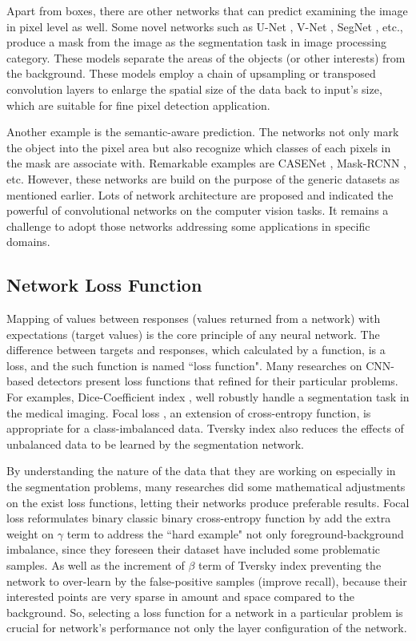 \documentclass[default,pdflatex,iicol]{sn-jnl}%
\begin{document}
Apart from boxes, there are other networks that can predict examining the image in pixel level as well. Some novel networks such as U-Net \cite{unet}, V-Net \cite{vnet}, SegNet \cite{segnet}, etc., produce a mask from the image as the segmentation task in image processing category. These models separate the areas of the objects (or other interests) from the background. These models employ a chain of upsampling or transposed convolution layers to enlarge the spatial size of the data back to input's size, which are suitable for fine pixel detection application.

Another example is the semantic-aware prediction. The networks not only mark the object into the pixel area but also recognize which classes of each pixels in the mask are associate with. Remarkable examples are CASENet \cite{casenet}, Mask-RCNN \cite{maskrcnn}, etc. However, these networks are build on the purpose of the generic datasets as mentioned earlier. Lots of network architecture are proposed and indicated the powerful of convolutional networks on the computer vision tasks. It remains a challenge to adopt those networks addressing some applications in specific domains.

\subsection{Network Loss Function}\label{review_loss}
Mapping of values between responses (values returned from a network) with expectations (target values) is the core principle of any neural network. The difference  between targets and responses, which calculated by a function, is a loss, and the such function is named ``loss function". Many researches on CNN-based detectors present loss functions that refined for their particular problems. For examples, Dice-Coefficient index \cite{vnet, gendice}, well robustly handle a segmentation task in the medical imaging. Focal loss \cite{focalloss1}, an extension of cross-entropy function, is appropriate for a class-imbalanced data. Tversky index \cite{tverskyloss} also reduces the effects of unbalanced data to be learned by the segmentation network.

By understanding the nature of the data that they are working on especially in the segmentation problems, many researches did some mathematical adjustments on the exist loss functions, letting their networks produce preferable results. Focal loss \cite{focalloss1} reformulates binary classic binary cross-entropy function by add the extra weight on $\gamma$ term to address the ``hard example" not only foreground-background imbalance, since they foreseen their dataset have included some problematic samples. As well as the increment of $\beta$ term of Tversky index \cite{tverskyloss} preventing the network to over-learn by the false-positive samples (improve recall), because their interested points are very sparse in amount and space compared to the background. So, selecting a loss function for a network in a particular problem is crucial for network's performance not only the layer configuration of the network.
\end{document}

